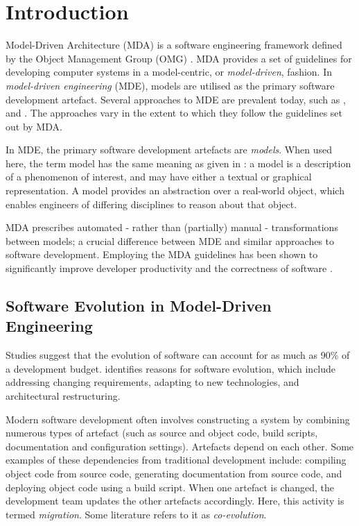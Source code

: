 \section{Introduction}
Model-Driven Architecture (MDA) is a software engineering framework defined by the Object Management
Group (OMG) \cite{omg}. MDA provides a set of guidelines for developing computer systems in a model-centric, or \textit{model-driven}, fashion. In \textit{model-driven engineering} (MDE), models are utilised as the primary software development artefact. Several approaches to MDE are prevalent today, such as \cite{stahl06mdsd}, \cite{kelly08dsm} and \cite{greenfield04software}. The approaches vary in the extent to which they follow the guidelines set out by MDA.

In MDE, the primary software development artefacts are \textit{models}. When used here, the term model has the same meaning as given in \cite{kolovos06eol}: a model is a description of a phenomenon of interest, and may have either a textual or graphical representation. A model provides an abstraction over a real-world object, which enables engineers of differing disciplines to reason about that object.

MDA prescribes automated - rather than (partially) manual - transformations between models; a crucial difference between MDE and similar approaches to software development. Employing the MDA guidelines has been shown to significantly improve developer productivity and the correctness of software \cite{watson08mdahistory}.

\subsection{Software Evolution in Model-Driven Engineering}
\label{Intro:MigrationProblem}
Studies \cite{erlikh00leveraging,moad90maintaining} suggest that the evolution of software can account for as much as 90\% of a development budget. \cite{sjoberg93quantifying} identifies reasons for software evolution, which include addressing changing requirements, adapting to new technologies, and architectural restructuring.

Modern software development often involves constructing a system by combining numerous types of artefact (such as source and object code, build scripts, documentation and configuration settings). Artefacts depend on each other. Some examples of these dependencies from traditional development include: compiling object code from source code, generating documentation from source code, and deploying object code using a build script. When one artefact is changed, the development team updates the other artefacts accordingly. Here, this activity is termed \textit{migration}. Some literature refers to it as \textit{co-evolution}.

